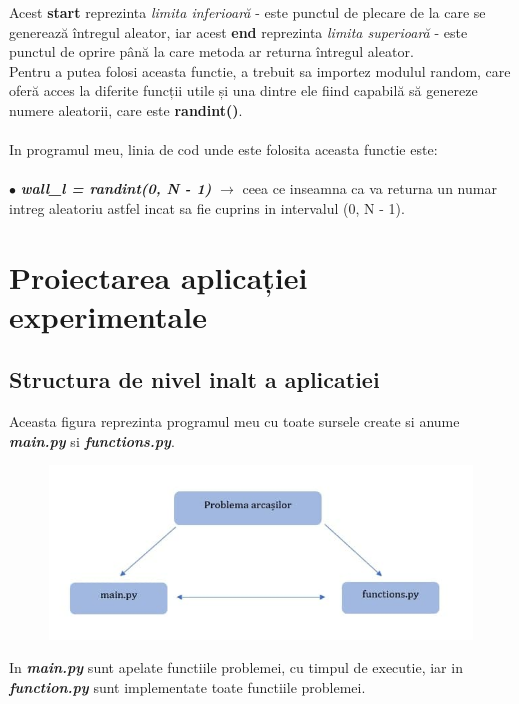 \documentclass{article}
\begin{document}
\hspace{0.6cm}Acest \textbf{start} reprezinta \textit{limita inferioară} - este punctul de plecare de la care se generează întregul aleator, iar acest \textbf{end} reprezinta \textit{limita superioară} - este punctul de oprire până la care metoda ar returna întregul aleator.
\\

\hspace*{0.5cm}  Pentru a putea folosi aceasta functie, a trebuit sa importez modulul random, care oferă acces la diferite funcții utile și una dintre ele fiind capabilă să genereze numere aleatorii, care este \textbf{randint()}.\\ 
\\
\hspace*{1cm}  In programul meu, linia de cod unde este folosita aceasta functie este: \\
\\
$\bullet$ \textbf{\textit{wall\_l = randint(0, N - 1)}} $\rightarrow$ ceea ce inseamna ca va returna un numar intreg aleatoriu astfel incat sa fie cuprins in intervalul (0, N - 1).

\section{Proiectarea aplicației experimentale}
\vspace{0.8cm} 
\subsection{Structura de nivel inalt a aplicatiei}
\hspace{1cm}Aceasta figura reprezinta programul meu cu toate sursele create si anume \textbf{\textit{main.py}} si \textbf{\textit{functions.py}}. \\

\begin{figure}[htbp!]
\centering
\includegraphics[scale=0.7]{arch}
\end{figure}
In \textbf{\textit{main.py}} sunt apelate functiile problemei, cu timpul de executie, iar in \textbf{\textit{function.py}} sunt implementate toate functiile problemei.
\end{document}
